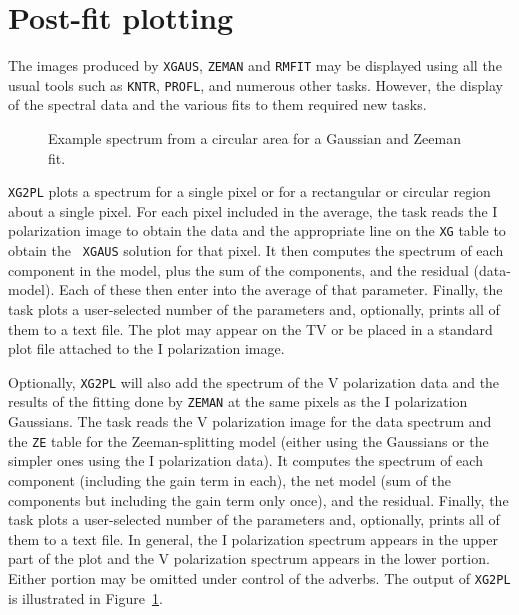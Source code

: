 \documentclass[twoside]{article}
\newcommand{\Me}[1]{\textcolor{mecol}{#1}}
\newcommand{\mecol}{\color{mecol}}
\newcommand{\putfig}[1]{\texttt{[image: \#1.eps]}}
\begin{document}
\mecol
\section{Post-fit plotting}

The images produced by {\tt XGAUS}, {\tt ZEMAN} and {\tt RMFIT} may be
displayed using all the usual tools such as {\tt KNTR}, {\tt PROFL},
and numerous other tasks.  However, the display of the spectral data
and the various fits to them required new tasks.

\begin{figure}
\begin{center}
\resizebox{6.0in}{!}{\putfig{XG2PL}}
\caption{\Me{Example spectrum from a circular area for a Gaussian and
  Zeeman fit.}}
\label{fig:XG2PL}
\end{center}
\end{figure}

{\tt XG2PL} plots a spectrum for a single pixel or for a rectangular
or circular region about a single pixel.  For each pixel included in
the average, the task reads the I polarization image to obtain the
data and the appropriate line on the {\tt XG} table to obtain the {\tt
  XGAUS} solution for that pixel.  It then computes the spectrum of
each component in the model, plus the sum of the components, and the
residual (data-model).  Each of these then enter into the average of
that parameter.  Finally, the task plots a user-selected number of the
parameters and, optionally, prints all of them to a text file.  The
plot may appear on the TV or be placed in a standard plot file
attached to the I polarization image.

Optionally, {\tt XG2PL} will also add the spectrum of the V
polarization data and the results of the fitting done by {\tt ZEMAN}
at the same pixels as the I polarization Gaussians.  The task reads
the V polarization image for the data spectrum and the {\tt ZE} table
for the Zeeman-splitting model (either using the Gaussians or the
simpler ones using the I polarization data).  It computes the spectrum
of each component (including the gain term in each), the net model
(sum of the components but including the gain term only once), and the
residual.  Finally, the task plots a user-selected number of the
parameters and, optionally, prints all of them to a text file.  In
general, the I polarization spectrum appears in the upper part of the
plot and the V polarization spectrum appears in the lower portion.
Either portion may be omitted under control of the adverbs.  The
output of {\tt XG2PL} is illustrated in Figure~\ref{fig:XG2PL}.
\end{document}
